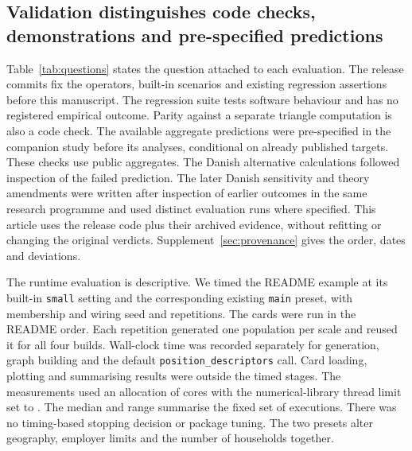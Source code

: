 \subsection{Validation distinguishes code checks, demonstrations and pre-specified predictions}

Table~\ref{tab:questions} states the question attached to each evaluation. The release commits fix the operators, built-in scenarios and existing regression assertions before this manuscript. The regression suite tests software behaviour and has no registered empirical outcome. Parity against a separate triangle computation is also a code check. The available aggregate predictions were pre-specified in the companion study before its analyses, conditional on already published targets. These checks use public aggregates. The Danish alternative calculations followed inspection of the failed prediction. The later Danish sensitivity and theory amendments were written after inspection of earlier outcomes in the same research programme and used distinct evaluation runs where specified. This article uses the release code plus their archived evidence, without refitting or changing the original verdicts. Supplement~\ref{sec:provenance} gives the order, dates and deviations.


The runtime evaluation is descriptive. We timed the README example at its built-in \texttt{small} setting and the corresponding existing \texttt{main} preset, with membership and wiring seed \ExampleSeed{} and \RepeatCount{} repetitions. The cards were run in the README order. Each repetition generated one population per scale and reused it for all four builds. Wall-clock time was recorded separately for generation, graph building and the default \texttt{position\_descriptors} call. Card loading, plotting and summarising results were outside the timed stages. The measurements used an allocation of \CpuCount{} cores with the numerical-library thread limit set to \ThreadCount{}. The median and range summarise the fixed set of executions. There was no timing-based stopping decision or package tuning. The two presets alter geography, employer limits and the number of households together.
\FloatBarrier
